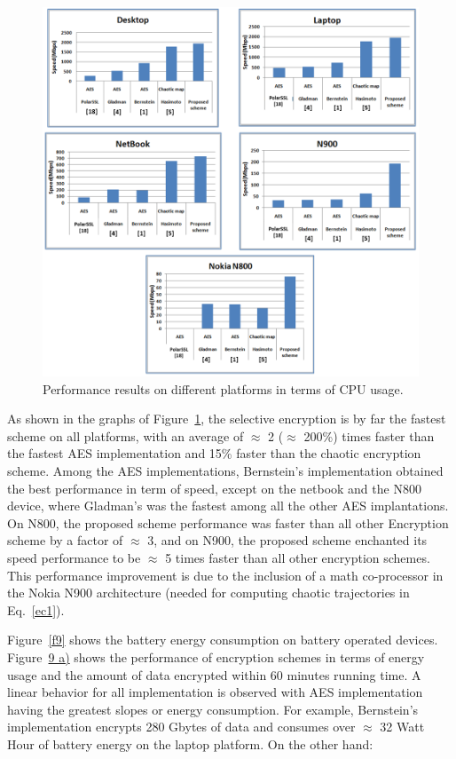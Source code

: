 \documentclass[preprint]{elsarticle}
\begin{document}
\begin{figure}[!ht]
\centering
\includegraphics[width=\textwidth]{figure8.png}
\caption{Performance results on different platforms in terms of CPU usage.}
\label{f8}
\end{figure} 

As shown in the graphs of Figure~\ref{f8}, the selective encryption is by far the fastest scheme on all platforms, with an average of $\approx$ 2 ($\approx$ 200\%) times faster than the fastest AES implementation and 15\% faster than the chaotic encryption scheme. Among the AES implementations, Bernstein's implementation obtained the best performance in term of speed, except on the netbook and the N800 device, where Gladman's was the fastest among all the other AES implantations. On N800, the proposed scheme performance was faster than all other Encryption scheme by a factor of $\approx$ 3, and on N900, the proposed scheme enchanted its speed performance to be $\approx$ 5 times faster than all other encryption schemes. This performance improvement is due to the inclusion of a math co-processor in the Nokia N900 architecture (needed for computing chaotic trajectories in Eq.~\ref{ec1}).


Figure~\ref{f9} shows the battery energy consumption on battery operated devices. Figure~\hyperref[f9]{9 a)} shows the performance of encryption schemes in terms of energy usage and the amount of data encrypted within 60 minutes running time. A linear behavior for all implementation is observed with AES implementation having the greatest slopes or energy consumption. For example, Bernstein's implementation encrypts 280 Gbytes of data and consumes over $\approx$ 32 Watt Hour of battery energy on the laptop platform. On the other hand:
\end{document}
